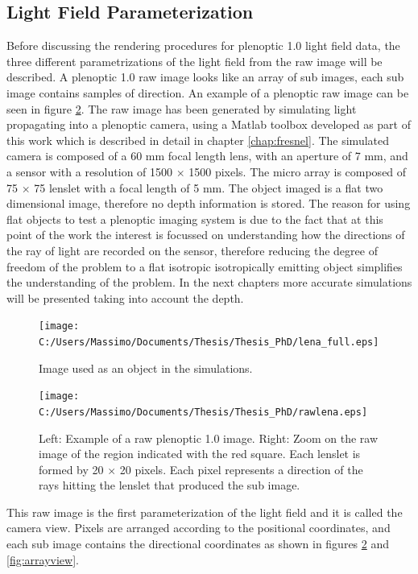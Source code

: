 \subsection{Light Field Parameterization}
\label{sec:LFparam}
Before discussing the rendering procedures for plenoptic 1.0 light field data, the three different parametrizations of the light field from the raw image will be described. A plenoptic 1.0 raw image looks like an array of sub images, each sub image contains samples of direction. An example of a plenoptic raw image can be seen in figure \ref{fig:rawlena10}. The raw image has been generated by simulating light propagating into a plenoptic camera, using a Matlab toolbox developed as part of this work which is described in detail in chapter \ref{chap:fresnel}. The simulated camera is composed of a 60 mm focal length lens, with an aperture of 7 mm, and a sensor with a resolution of 1500 $\times$ 1500 pixels. The micro array is composed of 75 $\times$ 75 lenslet with a focal length of 5 mm. The object imaged is a flat two dimensional image, therefore no depth information is stored. The reason for using flat objects to test a plenoptic imaging system is due to the fact that at this point of the work the interest is focussed on  understanding how the directions of the ray of light are recorded on the sensor, therefore reducing the degree of freedom of the problem to a flat isotropic isotropically emitting object simplifies the understanding of the problem. In the next chapters more accurate simulations will be presented taking into account the depth.
\newpage
\begin{figure}[H]
	\centering
	\texttt{[image: C:/Users/Massimo/Documents/Thesis/Thesis\_PhD/lena\_full.eps]}
	\caption{\label{fig:lenafull} Image used as an object in the simulations.}
\end{figure}
\begin{figure}[H]
	\centering
	\texttt{[image: C:/Users/Massimo/Documents/Thesis/Thesis\_PhD/rawlena.eps]}
	\caption{\label{fig:rawlena10}Left: Example of a raw plenoptic 1.0 image. Right: Zoom on the raw image of the region indicated with the red square. Each lenslet is formed by 20 $\times$ 20 pixels. Each pixel represents a direction of the rays hitting the lenslet that produced the sub image.  }
\end{figure}
This raw image is the first parameterization of the light field and it is called the camera view. Pixels are arranged according to the positional coordinates, and each sub image contains the directional coordinates as shown in figures \ref{fig:rawlena10} and \ref{fig:arrayview}. \\
